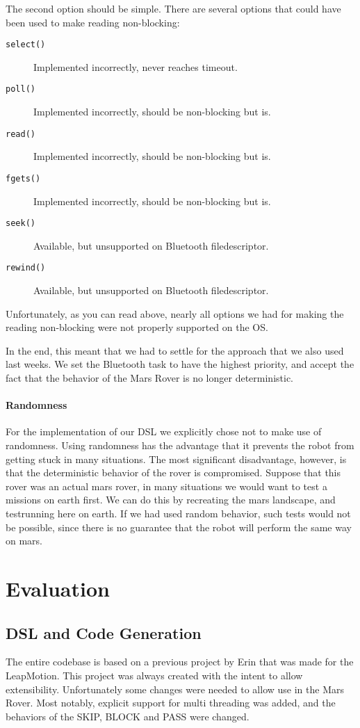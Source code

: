 \documentclass{scrartcl}
\begin{document}
The second option should be simple.
There are several options that could have been used to make reading non-blocking:
\begin{description}
	\item[\texttt{select()}] Implemented incorrectly, never reaches timeout.
	\item[\texttt{poll()}] Implemented incorrectly, should be non-blocking but is.
	\item[\texttt{read()}] Implemented incorrectly, should be non-blocking but is.
	\item[\texttt{fgets()}] Implemented incorrectly, should be non-blocking but is.
	\item[\texttt{seek()}] Available, but unsupported on Bluetooth filedescriptor.
	\item[\texttt{rewind()}] Available, but unsupported on Bluetooth filedescriptor.
\end{description}
Unfortunately, as you can read above, nearly all options we had for making the reading non-blocking were not properly supported on the OS.

In the end, this meant that we had to settle for the approach that we also used last weeks.
We set the Bluetooth task to have the highest priority, and accept the fact that the behavior of the Mars Rover is no longer deterministic.

\paragraph{Randomness}
For the implementation of our DSL we explicitly chose not to make use of randomness.
Using randomness has the advantage that it prevents the robot from getting stuck in many situations.
The most significant disadvantage, however, is that the deterministic behavior of the rover is compromised.
Suppose that this rover was an actual mars rover, in many situations we would want to test a missions on earth first.
We can do this by recreating the mars landscape, and testrunning here on earth.
If we had used random behavior, such tests would not be possible, since there is no guarantee that the robot will perform the same way on mars.

\section{Evaluation}
\subsection{DSL and Code Generation}
The entire codebase is based on a previous project by Erin that was made for the LeapMotion.
This project was always created with the intent to allow extensibility.
Unfortunately some changes were needed to allow use in the Mars Rover.
Most notably, explicit support for multi threading was added, and the behaviors of the SKIP, BLOCK and PASS were changed.
\end{document}
